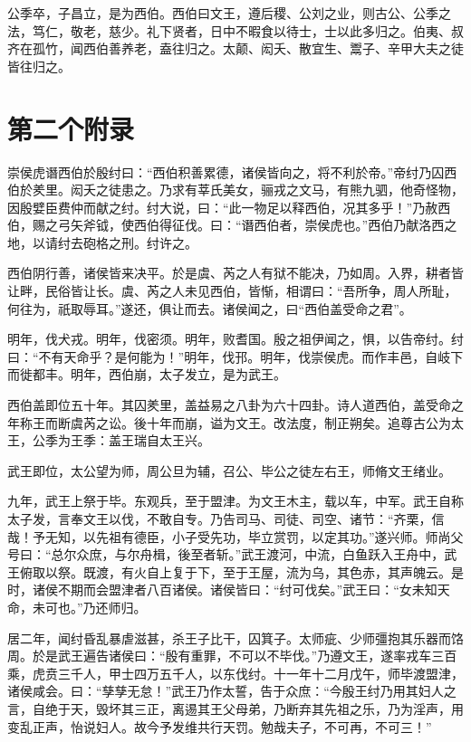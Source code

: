 \documentclass[UTF8,12pt,AutoFakeBold]{ctexart}
\begin{document}
\begin{appendices}
		公季卒，子昌立，是为西伯。西伯曰文王，遵后稷、公刘之业，则古公、公季之法，笃仁，敬老，慈少。礼下贤者，日中不暇食以待士，士以此多归之。伯夷、叔齐在孤竹，闻西伯善养老，盍往归之。太颠、闳夭、散宜生、鬻子、辛甲大夫之徒皆往归之。
		
		\pagebreak %
		
		\section{第二个附录\label{附录：第二个附录}}
		崇侯虎谮西伯於殷纣曰：“西伯积善累德，诸侯皆向之，将不利於帝。”帝纣乃囚西伯於羑里。闳夭之徒患之。乃求有莘氏美女，骊戎之文马，有熊九驷，他奇怪物，因殷嬖臣费仲而献之纣。纣大说，曰：“此一物足以释西伯，况其多乎！”乃赦西伯，赐之弓矢斧钺，使西伯得征伐。曰：“谮西伯者，崇侯虎也。”西伯乃献洛西之地，以请纣去砲格之刑。纣许之。
		
		西伯阴行善，诸侯皆来决平。於是虞、芮之人有狱不能决，乃如周。入界，耕者皆让畔，民俗皆让长。虞、芮之人未见西伯，皆惭，相谓曰：“吾所争，周人所耻，何往为，祇取辱耳。”遂还，俱让而去。诸侯闻之，曰“西伯盖受命之君”。
		
		明年，伐犬戎。明年，伐密须。明年，败耆国。殷之祖伊闻之，惧，以告帝纣。纣曰：“不有天命乎？是何能为！”明年，伐邘。明年，伐崇侯虎。而作丰邑，自岐下而徙都丰。明年，西伯崩，太子发立，是为武王。
		
		西伯盖即位五十年。其囚羑里，盖益易之八卦为六十四卦。诗人道西伯，盖受命之年称王而断虞芮之讼。後十年而崩，谥为文王。改法度，制正朔矣。追尊古公为太王，公季为王季：盖王瑞自太王兴。
		
		武王即位，太公望为师，周公旦为辅，召公、毕公之徒左右王，师脩文王绪业。
		
		九年，武王上祭于毕。东观兵，至于盟津。为文王木主，载以车，中军。武王自称太子发，言奉文王以伐，不敢自专。乃告司马、司徒、司空、诸节：“齐栗，信哉！予无知，以先祖有德臣，小子受先功，毕立赏罚，以定其功。”遂兴师。师尚父号曰：“总尔众庶，与尔舟楫，後至者斩。”武王渡河，中流，白鱼跃入王舟中，武王俯取以祭。既渡，有火自上复于下，至于王屋，流为乌，其色赤，其声魄云。是时，诸侯不期而会盟津者八百诸侯。诸侯皆曰：“纣可伐矣。”武王曰：“女未知天命，未可也。”乃还师归。
		
		居二年，闻纣昏乱暴虐滋甚，杀王子比干，囚箕子。太师疵、少师彊抱其乐器而饹周。於是武王遍告诸侯曰：“殷有重罪，不可以不毕伐。”乃遵文王，遂率戎车三百乘，虎贲三千人，甲士四万五千人，以东伐纣。十一年十二月戊午，师毕渡盟津，诸侯咸会。曰：“孳孳无怠！”武王乃作太誓，告于众庶：“今殷王纣乃用其妇人之言，自绝于天，毁坏其三正，离逷其王父母弟，乃断弃其先祖之乐，乃为淫声，用变乱正声，怡说妇人。故今予发维共行天罚。勉哉夫子，不可再，不可三！”
		\pagebreak
	\end{appendices}
	
\end{document}
